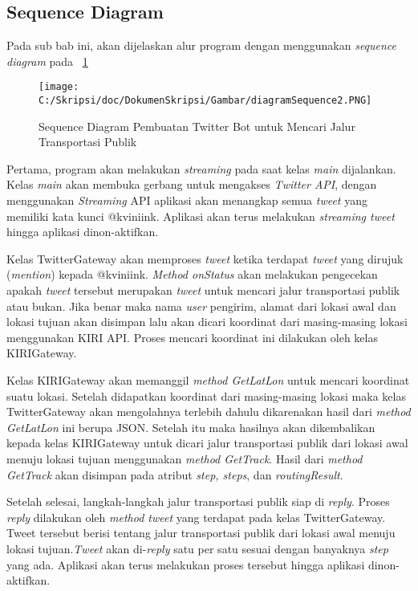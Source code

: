\subsection{Sequence Diagram}

Pada sub bab ini, akan dijelaskan alur program dengan menggunakan \textit{sequence diagram} pada ~\ref{fig:diagramSequence2}

\begin{figure}[htbp]
	\centering
		\texttt{[image: C:/Skripsi/doc/DokumenSkripsi/Gambar/diagramSequence2.PNG]}
	\caption{Sequence Diagram Pembuatan Twitter Bot untuk Mencari Jalur Transportasi Publik}
	\label{fig:diagramSequence2}
\end{figure}


Pertama, program akan melakukan \textit{streaming} pada saat kelas \textit{main} dijalankan. Kelas \textit{main} akan membuka gerbang untuk mengakses \textit{Twitter API}, dengan menggunakan \textit{Streaming} API aplikasi akan menangkap semua \textit{tweet} yang memiliki kata kunci @kviniink. Aplikasi akan terus melakukan \textit{streaming tweet} hingga aplikasi dinon-aktifkan.

Kelas TwitterGateway akan memproses \textit{tweet} ketika terdapat \textit{tweet} yang dirujuk (\textit{mention}) kepada @kviniink. \textit{Method onStatus} akan melakukan pengecekan apakah \textit{tweet} tersebut merupakan \textit{tweet} untuk mencari jalur transportasi publik atau bukan. Jika benar maka nama \textit{user} pengirim, alamat dari lokasi awal dan lokasi tujuan akan disimpan lalu akan dicari koordinat dari masing-masing lokasi menggunakan KIRI API. Proses mencari koordinat ini dilakukan oleh kelas KIRIGateway.

Kelas KIRIGateway akan memanggil \textit{method GetLatLon} untuk mencari koordinat suatu lokasi. Setelah didapatkan koordinat dari masing-masing lokasi maka kelas TwitterGateway akan mengolahnya terlebih dahulu dikarenakan hasil dari \textit{method GetLatLon} ini berupa JSON. Setelah itu maka hasilnya akan dikembalikan kepada kelas KIRIGateway untuk dicari jalur transportasi publik dari lokasi awal menuju lokasi tujuan menggunakan \textit{method GetTrack}. Hasil dari \textit{method GetTrack} akan disimpan pada atribut \textit{step, steps}, dan \textit{routingResult}.

Setelah selesai, langkah-langkah jalur transportasi publik siap di \textit{reply}. Proses \textit{reply} dilakukan oleh \textit{method tweet} yang terdapat pada kelas TwitterGateway. Tweet tersebut berisi tentang jalur transportasi publik dari lokasi awal menuju lokasi tujuan.\textit{Tweet} akan di-\textit{reply} satu per satu sesuai dengan banyaknya \textit{step} yang ada. Aplikasi akan terus melakukan proses tersebut hingga aplikasi dinon-aktifkan.

